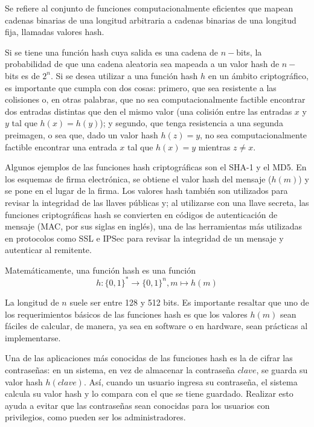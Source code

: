 %
%

Se refiere al conjunto de funciones computacionalmente eficientes que
mapean cadenas binarias de una longitud arbitraria a cadenas binarias
de una longitud fija, llamadas valores hash.

Si se tiene una función hash cuya salida es una cadena de $n-$bits, 
la probabilidad de que una cadena aleatoria
sea mapeada a un valor hash de $n-$bits es de $2^n$. Si se desea utilizar
a una función hash $h$ en un ámbito criptográfico, es importante que 
cumpla con dos cosas: primero, que sea resistente a las colisiones o, 
en otras palabras, que no sea computacionalmente factible encontrar dos entradas distintas que den el mismo valor (una colisión entre las entradas $x$ y $y$ tal que $h(x) = h(y)$); y segundo, que tenga resistencia a una segunda preimagen, o sea que, dado un valor hash $h(z) = y$, no sea computacionalmente factible encontrar una entrada $x$ tal que $h(x) = y$ mientras $z \neq x$.

Algunos ejemplos de las funciones hash criptográficas son el SHA-1 y el 
MD5. En los esquemas de firma electrónica, se obtiene el valor hash del
mensaje ($h(m)$) y se pone en el lugar de la firma. Los valores hash 
también son utilizados para revisar la integridad de las llaves públicas 
y; al utilizarse con una llave secreta, las funciones criptográficas hash
se convierten en códigos de autenticación de mensaje (MAC, por sus siglas
en inglés), una de las herramientas más utilizadas en protocolos como SSL
e IPSec para revisar la integridad de un mensaje y autenticar al 
remitente.

Matemáticamente, una función hash es una función
\begin{equation}
  \label{funcion_hash_def}
 	h: \{0, 1\}^* \longrightarrow \{0,1\}^n, m \longmapsto h(m)
\end{equation}

La longitud de $n$ suele ser entre 128 y 512 bits. 
Es importante resaltar que uno de los requerimientos básicos de las
funciones hash es que los valores $h(m)$ sean fáciles de calcular, 
de manera, ya sea en software o en hardware, sean prácticas al 
implementarse. 

Una de las aplicaciones más conocidas de las funciones hash es la de
cifrar las contraseñas: en un sistema, en vez de almacenar la contraseña
$clave$, se guarda su valor hash $h(clave)$. Así, cuando un usuario 
ingresa su contraseña, el sistema calcula su valor hash y lo compara con
el que se tiene guardado. Realizar esto ayuda a evitar que las contraseñas
sean conocidas para los usuarios con privilegios, como pueden ser los 
administradores.

